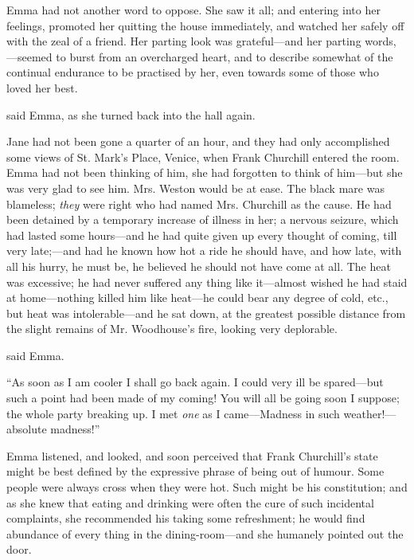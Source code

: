 Emma had not another word to oppose. She saw it all; and entering into her feelings, promoted her quitting the house immediately, and watched her safely off with the zeal of a friend. Her parting look was grateful---and her parting words, ---seemed to burst from an overcharged heart, and to describe somewhat of the continual endurance to be practised by her, even towards some of those who loved her best.

 said Emma, as she turned back into the hall again. 

Jane had not been gone a quarter of an hour, and they had only accomplished some views of St. Mark's Place, Venice, when Frank Churchill entered the room. Emma had not been thinking of him, she had forgotten to think of him---but she was very glad to see him. Mrs. Weston would be at ease. The black mare was blameless; {\em they} were right who had named Mrs. Churchill as the cause. He had been detained by a temporary increase of illness in her; a nervous seizure, which had lasted some hours---and he had quite given up every thought of coming, till very late;---and had he known how hot a ride he should have, and how late, with all his hurry, he must be, he believed he should not have come at all. The heat was excessive; he had never suffered any thing like it---almost wished he had staid at home---nothing killed him like heat---he could bear any degree of cold, etc., but heat was intolerable---and he sat down, at the greatest possible distance from the slight remains of Mr. Woodhouse's fire, looking very deplorable.

 said Emma.

“As soon as I am cooler I shall go back again. I could very ill be spared---but such a point had been made of my coming! You will all be going soon I suppose; the whole party breaking up. I met {\em one} as I came---Madness in such weather!---absolute madness!”

Emma listened, and looked, and soon perceived that Frank Churchill's state might be best defined by the expressive phrase of being out of humour. Some people were always cross when they were hot. Such might be his constitution; and as she knew that eating and drinking were often the cure of such incidental complaints, she recommended his taking some refreshment; he would find abundance of every thing in the dining-room---and she humanely pointed out the door.

